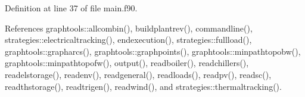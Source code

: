 Definition at line 37 of file main.\-f90.



References graphtools\-::allcombin(), buildplantrev(), commandline(), strategies\-::electricaltracking(), endexecution(), strategies\-::fullload(), graphtools\-::grapharcs(), graphtools\-::graphpoints(), graphtools\-::minpathtopobw(), graphtools\-::minpathtopofw(), output(), readboiler(), readchillers(), readelstorage(), readenv(), readgeneral(), readloads(), readpv(), readsc(), readthstorage(), readtrigen(), readwind(), and strategies\-::thermaltracking().

